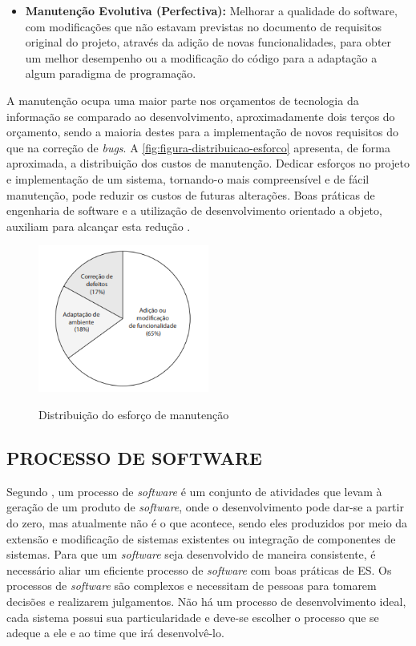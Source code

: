  \begin{itemize}  
    \item \textbf{Manutenção Evolutiva (Perfectiva):} Melhorar a qualidade do software, com modificações que não estavam previstas no documento de requisitos original do projeto, através da adição de novas funcionalidades, para obter um melhor desempenho ou a modificação do código para a adaptação a algum paradigma de programação. 
\end{itemize}
    
A manutenção ocupa uma maior parte nos orçamentos de tecnologia da informação se comparado ao desenvolvimento, aproximadamente dois terços do orçamento, sendo a maioria destes para a implementação de novos requisitos do que na correção de \textit{bugs}. A \autoref{fig:figura-distribuicao-esforco} apresenta, de forma aproximada, a distribuição dos custos de manutenção. Dedicar esforços no projeto e implementação de um sistema, tornando-o mais compreensível e de fácil manutenção, pode reduzir os custos de futuras alterações. Boas práticas de engenharia de software e a utilização de desenvolvimento orientado a objeto, auxiliam para alcançar esta redução \cite{iansommerville}.
\begin{figure}[!htb]
    \centering
    \caption{Distribuição do esforço de manutenção}
    \includegraphics[width=0.5\textwidth]{./dados/figuras/distribuicao_do_esforco_de_manutencao}
    \label{fig:figura-distribuicao-esforco}
\end{figure}



\subsection{PROCESSO DE SOFTWARE}
\label{subsec:processoDeSoftware}

Segundo , um processo de \textit{software} é um conjunto de atividades que levam à geração de um produto de \textit{software}, onde o desenvolvimento pode dar-se a partir do zero, mas atualmente não é o que acontece, sendo eles produzidos por meio da extensão e modificação de sistemas existentes ou integração de componentes de sistemas. Para que um \textit{software} seja desenvolvido de maneira consistente, é necessário aliar um eficiente processo de \textit{software} com boas práticas de ES. Os processos de \textit{software} são complexos e necessitam de pessoas para tomarem decisões e realizarem julgamentos. Não há um processo de desenvolvimento ideal, cada sistema possui sua particularidade e deve-se escolher o processo que se adeque a ele e ao time que irá desenvolvê-lo. 

